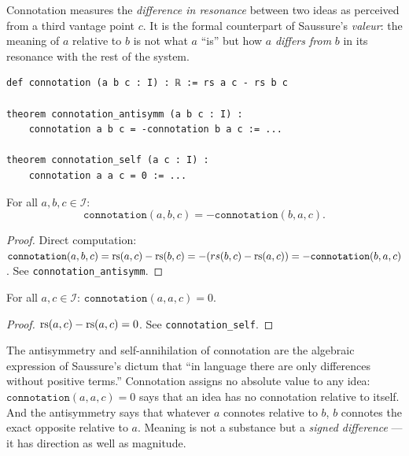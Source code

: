 Connotation measures the \emph{difference in resonance} between two
ideas as perceived from a third vantage point $c$. It is the formal
counterpart of Saussure's \textit{valeur}: the meaning of $a$ relative
to $b$ is not what $a$ ``is'' but how $a$ \emph{differs from} $b$ in
its resonance with the rest of the system.

\begin{lstlisting}[caption={Connotation: definition and key properties}]
def connotation (a b c : I) : ℝ := rs a c - rs b c

theorem connotation_antisymm (a b c : I) :
    connotation a b c = -connotation b a c := ...

theorem connotation_self (a c : I) :
    connotation a a c = 0 := ...
\end{lstlisting}

\begin{theorem}
\label{thm:connotation-antisymm}
For all $a, b, c \in \mathcal{I}$:
\[
  \texttt{connotation}(a, b, c) = -\texttt{connotation}(b, a, c).
\]
\end{theorem}

\begin{proof}
Direct computation:
$\texttt{connotation}(a,b,c) = \mathrm{rs}(a,c) - \mathrm{rs}(b,c) = -(rs(b,c) - \mathrm{rs}(a,c)) = -\texttt{connotation}(b,a,c)$.
See \texttt{connotation\_antisymm}.
\end{proof}

\begin{theorem}
\label{thm:connotation-self}
For all $a, c \in \mathcal{I}$:
$\texttt{connotation}(a, a, c) = 0$.
\end{theorem}

\begin{proof}
$\mathrm{rs}(a, c) - \mathrm{rs}(a, c) = 0$. See \texttt{connotation\_self}.
\end{proof}

\begin{interpretation}
The antisymmetry and self-annihilation of connotation are the algebraic
expression of Saussure's dictum that ``in language there are only
differences without positive terms.'' Connotation assigns no absolute
value to any idea: $\texttt{connotation}(a, a, c) = 0$ says that
an idea has no connotation relative to itself. And the antisymmetry
says that whatever $a$ connotes relative to $b$, $b$ connotes the
exact opposite relative to $a$. Meaning is not a substance but a
\emph{signed difference} --- it has direction as well as magnitude.
\end{interpretation}

